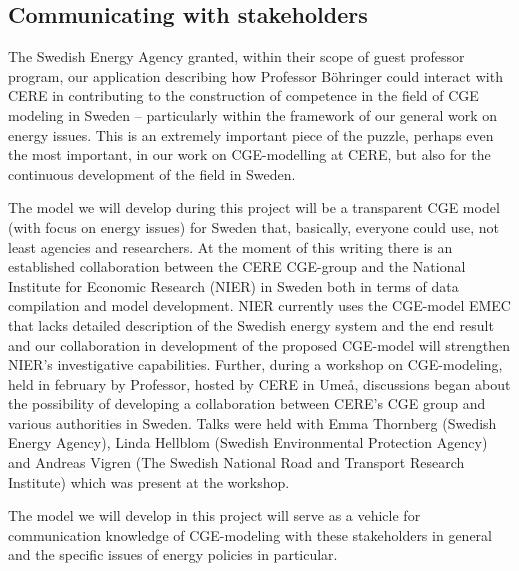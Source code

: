 \subsection{Communicating with stakeholders}
The Swedish Energy Agency granted, within their scope of guest professor program, our application describing how Professor Böhringer could interact with CERE in contributing to the construction of competence in the field of CGE modeling in Sweden – particularly within the framework of our general work on energy issues. This is an extremely important piece of the puzzle, perhaps even the most important, in our work on CGE-modelling at CERE, but also for the continuous development of the field in Sweden.

The model we will develop during this project will be a transparent CGE model (with focus on energy issues) for Sweden that, basically, everyone could use, not least agencies and researchers. At the moment of this writing there is an established collaboration between the CERE CGE-group and the National Institute for Economic Research (NIER) in Sweden both in terms of data compilation and model development. NIER currently uses the CGE-model EMEC that lacks detailed description of the Swedish energy system and the end result and our collaboration in development of the proposed CGE-model will strengthen NIER's investigative capabilities. Further, during a workshop on CGE-modeling, held in february by Professor, hosted by CERE in Umeå, discussions began about the possibility of developing a collaboration between CERE's CGE group and various authorities in Sweden. Talks were held with Emma Thornberg (Swedish Energy Agency), Linda Hellblom (Swedish Environmental Protection Agency) and Andreas Vigren (The Swedish National Road and Transport Research Institute) which was present at the workshop.

The model we will develop in this project will serve as a vehicle for communication knowledge of CGE-modeling with these stakeholders in general and the specific issues of energy policies in particular.


